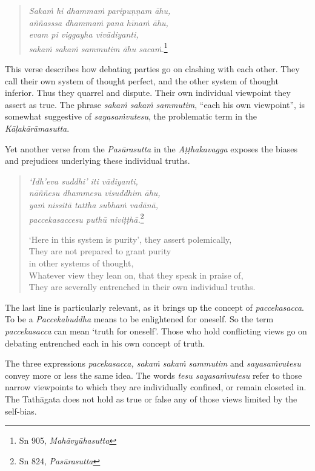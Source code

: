 \begin{quote}
\emph{Sakaṁ hi dhammaṁ paripuṇṇam āhu,}\\
\emph{aññasssa dhammaṁ pana hīnaṁ āhu,}\\
\emph{evam pi viggayha vivādiyanti,}\\
\emph{sakaṁ sakaṁ sammutim āhu sacaṁ.}\footnote{Sn 905, \emph{Mahāvyūhasutta}}
\end{quote}

This verse describes how debating parties go on clashing with each other. They call their own system of thought perfect, and the other system of thought inferior. Thus they quarrel and dispute. Their own individual viewpoint they assert as true. The phrase \emph{sakaṁ sakaṁ sammutim}, ``each his own viewpoint'', is somewhat suggestive of \emph{sayasaṁvutesu}, the problematic term in the \emph{Kāḷakārāmasutta}.

Yet another verse from the \emph{Pasūrasutta} in the \emph{Aṭṭhakavagga} exposes the biases and prejudices underlying these individual truths.

\begin{quote}
\emph{`Idh'eva suddhi' iti vādiyanti,}\\
\emph{nāññesu dhammesu visuddhim āhu,}\\
\emph{yaṁ nissitā tattha subhaṁ vadānā,}\\
\emph{paccekasaccesu puthū niviṭṭhā.}\footnote{Sn 824, \emph{Pasūrasutta}}

`Here in this system is purity', they assert polemically,\\
They are not prepared to grant purity\\
\vin in other systems of thought,\\
Whatever view they lean on, that they speak in praise of,\\
They are severally entrenched in their own individual truths.
\end{quote}

The last line is particularly relevant, as it brings up the concept of \emph{paccekasacca}. To be a \emph{Paccekabuddha} means to be enlightened for oneself. So the term \emph{paccekasacca} can mean `truth for oneself'. Those who hold conflicting views go on debating entrenched each in his own concept of truth.

The three expressions \emph{pacekasacca, sakaṁ sakaṁ sammutim} and \emph{sayasaṁvutesu} convey more or less the same idea. The words \emph{tesu sayasaṁvutesu} refer to those narrow viewpoints to which they are individually confined, or remain closeted in. The Tathāgata does not hold as true or false any of those views limited by the self-bias.

